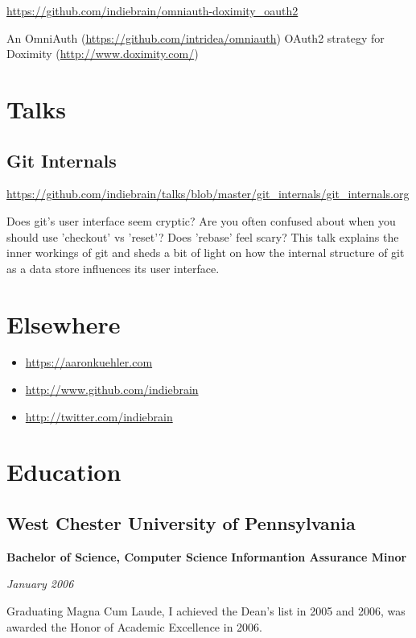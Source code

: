 \documentclass[12pt letterpaper notitlepage]{article}
\begin{document}
\url{https://github.com/indiebrain/omniauth-doximity\_oauth2}

An OmniAuth (\url{https://github.com/intridea/omniauth}) OAuth2 strategy for
Doximity (\url{http://www.doximity.com/})

\section*{Talks}
\label{sec:org20d7e54}

\subsection*{Git Internals}
\label{sec:orge7894c1}

\url{https://github.com/indiebrain/talks/blob/master/git\_internals/git\_internals.org}

Does git's user interface seem cryptic? Are you often confused about when you should use 'checkout' vs 'reset'? Does 'rebase' feel scary? This talk explains the inner workings of git and sheds a bit of light on how the internal structure of git as a data store influences its user interface.

\section*{Elsewhere}
\label{sec:org4a20ce1}

\begin{itemize}
\item \url{https://aaronkuehler.com}
\item \url{http://www.github.com/indiebrain}
\item \url{http://twitter.com/indiebrain}
\end{itemize}

\section*{Education}
\label{sec:orge401f5f}

\subsection*{West Chester University of Pennsylvania}
\label{sec:org5d51ead}

\textbf{Bachelor of Science, Computer Science}
\textbf{Informantion Assurance Minor}

\emph{January 2006}

Graduating Magna Cum Laude, I achieved the Dean's list in 2005 and 2006, was awarded the Honor of Academic Excellence in 2006.
\end{document}
